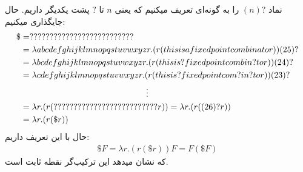 نماد $(n)?$ را به گونه‌ای تعریف میکنیم که یعنی $n$ تا $?$ پشت یکدیگر داریم. حال جایگذاری میکنیم:
\begin{gather*}
    \begin{split}
        \$ & = ?????????????????????????? \\
        & = \lambda abcdefghijklmnopqstuvwxyzr. (r(thisisafixedpointcombinator)) (25)? \\
        & = \lambda bcdefghijklmnopqstuvwxyzr. (r(thisis?fixedpointcombin?tor)) (24)? \\
        & = \lambda cdefghijklmnopqstuvwxyzr . (r(thisis?fixedpointcom?in?tor)) (23)? \\
        &          \hspace{5.2cm} \vdots \\
        & = \lambda r . (r(??????????????????????????r)) = \lambda r. (r ((26)? r)) \\
        & = \lambda r. (r (\$ r))
    \end{split}
\end{gather*}
حال با این تعریف داریم:
\begin{gather*}
    \$ F = \lambda r. (r(\$ r)) F = F(\$ F)
\end{gather*}
که نشان میدهد این ترکیب‌گر نقطه ثابت است.
